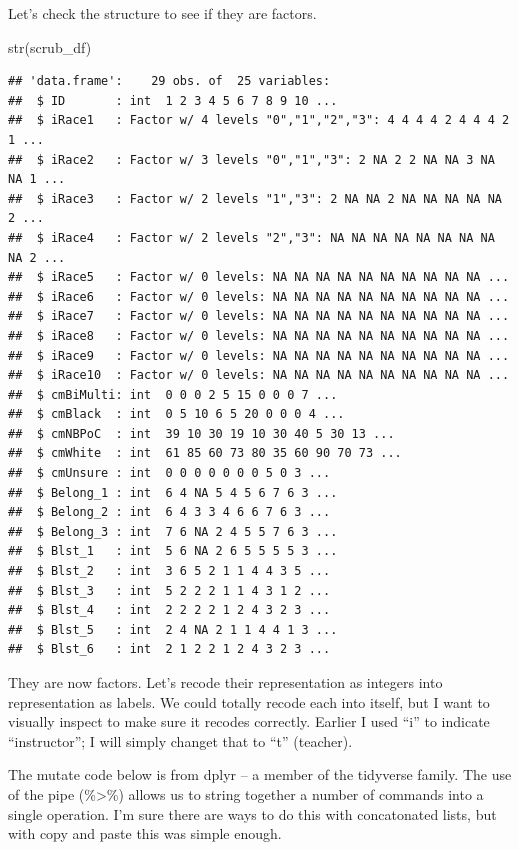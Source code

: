 \documentclass[
  english,
]{book}
\newenvironment{Shaded}{\begin{snugshade}}{\end{snugshade}}
\newcommand{\FunctionTok}[1]{\textcolor[rgb]{0.00,0.00,0.00}{#1}}
\newcommand{\NormalTok}[1]{#1}
\begin{document}
Let's check the structure to see if they are factors.

\begin{Shaded}
\begin{Highlighting}[]
\FunctionTok{str}\NormalTok{(scrub\_df)}
\end{Highlighting}
\end{Shaded}

\begin{verbatim}
## 'data.frame':    29 obs. of  25 variables:
##  $ ID       : int  1 2 3 4 5 6 7 8 9 10 ...
##  $ iRace1   : Factor w/ 4 levels "0","1","2","3": 4 4 4 4 2 4 4 4 2 1 ...
##  $ iRace2   : Factor w/ 3 levels "0","1","3": 2 NA 2 2 NA NA 3 NA NA 1 ...
##  $ iRace3   : Factor w/ 2 levels "1","3": 2 NA NA 2 NA NA NA NA NA 2 ...
##  $ iRace4   : Factor w/ 2 levels "2","3": NA NA NA NA NA NA NA NA NA 2 ...
##  $ iRace5   : Factor w/ 0 levels: NA NA NA NA NA NA NA NA NA NA ...
##  $ iRace6   : Factor w/ 0 levels: NA NA NA NA NA NA NA NA NA NA ...
##  $ iRace7   : Factor w/ 0 levels: NA NA NA NA NA NA NA NA NA NA ...
##  $ iRace8   : Factor w/ 0 levels: NA NA NA NA NA NA NA NA NA NA ...
##  $ iRace9   : Factor w/ 0 levels: NA NA NA NA NA NA NA NA NA NA ...
##  $ iRace10  : Factor w/ 0 levels: NA NA NA NA NA NA NA NA NA NA ...
##  $ cmBiMulti: int  0 0 0 2 5 15 0 0 0 7 ...
##  $ cmBlack  : int  0 5 10 6 5 20 0 0 0 4 ...
##  $ cmNBPoC  : int  39 10 30 19 10 30 40 5 30 13 ...
##  $ cmWhite  : int  61 85 60 73 80 35 60 90 70 73 ...
##  $ cmUnsure : int  0 0 0 0 0 0 0 5 0 3 ...
##  $ Belong_1 : int  6 4 NA 5 4 5 6 7 6 3 ...
##  $ Belong_2 : int  6 4 3 3 4 6 6 7 6 3 ...
##  $ Belong_3 : int  7 6 NA 2 4 5 5 7 6 3 ...
##  $ Blst_1   : int  5 6 NA 2 6 5 5 5 5 3 ...
##  $ Blst_2   : int  3 6 5 2 1 1 4 4 3 5 ...
##  $ Blst_3   : int  5 2 2 2 1 1 4 3 1 2 ...
##  $ Blst_4   : int  2 2 2 2 1 2 4 3 2 3 ...
##  $ Blst_5   : int  2 4 NA 2 1 1 4 4 1 3 ...
##  $ Blst_6   : int  2 1 2 2 1 2 4 3 2 3 ...
\end{verbatim}

They are now factors. Let's recode their representation as integers into representation as labels. We could totally recode each into itself, but I want to visually inspect to make sure it recodes correctly. Earlier I used ``i'' to indicate ``instructor''; I will simply changet that to ``t'' (teacher).

The mutate code below is from dplyr -- a member of the tidyverse family. The use of the pipe (\%\textgreater\%) allows us to string together a number of commands into a single operation. I'm sure there are ways to do this with concatonated lists, but with copy and paste this was simple enough.
\end{document}
